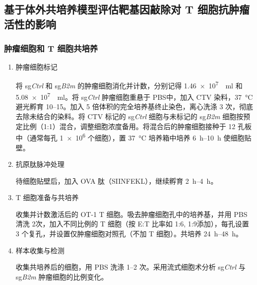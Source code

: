 \subsection{基于体外共培养模型评估靶基因敲除对 T 细胞抗肿瘤活性的影响}
\subsubsection{肿瘤细胞和 T 细胞共培养}
\begin{enumerate}
    \item 肿瘤细胞标记
    
    将 sg\textit{Ctrl} 和 sg\textit{B2m} 的肿瘤细胞消化并计数，分别记得 \qty{1.46e7}{\per\ml} 和 \qty{5.08e7}{\per\ml}。将 sg\textit{Ctrl} 肿瘤细胞重悬于 PBS中，加入 CTV 染料，\qty{37}{\celsius} 避光孵育 \qtyrange{10}{15}{\min}。加入 5 倍体积的完全培养基终止染色，离心洗涤 3 次，彻底去除未结合的染料。将 CTV 标记的 sg\textit{Ctrl} 细胞与未标记的 sg\textit{B2m} 细胞按预定比例（1:1）混合，调整细胞浓度备用。将混合后的肿瘤细胞接种于 12 孔板中（通常每孔 \qty{1e6}{} 个细胞），置 \qty{37}{\celsius} 培养箱中培养 \qtyrange{6}{10}{\hour} 使细胞贴壁。
    
    \item 抗原肽脉冲处理
    
    待细胞贴壁后，加入 OVA 肽（SIINFEKL），继续孵育 \qtyrange{2}{4}{\hour}。

    \item T 细胞准备与共培养
    
    收集并计数激活后的 OT-1 T 细胞。吸去肿瘤细胞孔中的培养基，并用 PBS 清洗 2次，加入不同比例的 T 细胞（按 E:T 比率如 1:6, 1:9添加），每孔设置 3 个复孔，并设置仅肿瘤细胞对照孔（不加 T 细胞）。共培养 \qtyrange{24}{48}{\hour}。

    \item 样本收集与检测

    收集共培养后的细胞，用 PBS 洗涤 \qtyrange{1}{2}{} 次。采用流式细胞术分析 sg\textit{Ctrl} 与 sg\textit{B2m} 肿瘤细胞的比例变化。
\end{enumerate}

